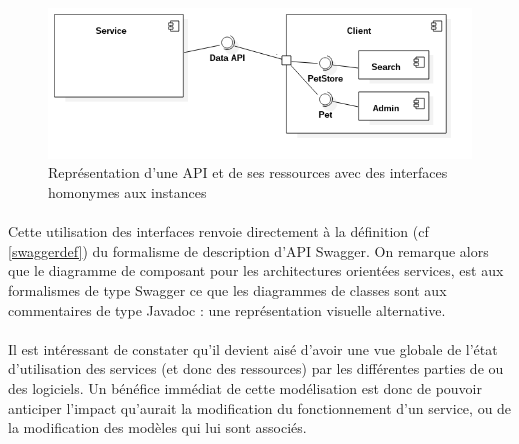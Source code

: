         \newpage
        \begin{figure}[h]
            \centering
            \includegraphics[scale=0.6]{./assets/UML/component2.png}
            \caption{Représentation d'une API et de ses ressources avec des interfaces homonymes aux instances}
        \end{figure}

        \paragraph{}
            Cette utilisation des interfaces renvoie directement à la définition (cf \ref{swaggerdef})
            du formalisme de description d'API Swagger. On remarque alors que le diagramme de composant pour
            les architectures orientées services, est aux formalismes de type Swagger ce que les diagrammes
            de classes sont aux commentaires de type Javadoc : une représentation visuelle alternative.


        \paragraph{}
            Il est intéressant de constater qu'il devient aisé d'avoir une vue globale de l'état
            d'utilisation des services (et donc des ressources) par les différentes parties de ou des
            logiciels. Un bénéfice immédiat de cette modélisation est donc de pouvoir anticiper l'impact
            qu'aurait la modification du fonctionnement d'un service, ou de la modification des modèles
            qui lui sont associés.
